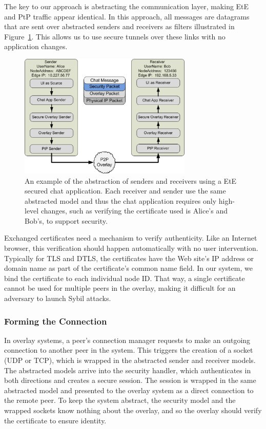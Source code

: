 \documentclass[conference]{IEEEtran}
\begin{document}
The key to our approach is abstracting the communication layer, making EtE and
PtP traffic appear identical. In this approach, all messages are datagrams that are sent
over abstracted senders and receivers as filters illustrated in
Figure~\ref{fig:senders_receivers}.  This allows us to use secure tunnels over
these links with no application changes.

\begin{figure}[h]
\centering
\includegraphics[width=3.25in]{secure_sender_stack_generic.png.eps}
\caption{An example of the abstraction of senders and receivers using a EtE 
secured chat application.  Each receiver and sender use the same abstracted
model and thus the chat application requires only high-level changes, such
as verifying the certificate used is Alice's and Bob's, to support security.}
\label{fig:senders_receivers}
\end{figure}

Exchanged certificates need a mechanism to verify authenticity.  Like an
Internet browser, this verification should happen automatically with no user
intervention.  Typically for TLS and DTLS, the certificates have the Web site's
IP address or domain name as part of the certificate's common name field.  In
our system, we bind the certificate to each individual node ID.  That way,
a single certificate cannot be used for multiple peers in the overlay, making
it difficult for an adversary to launch Sybil attacks.

\subsubsection{Forming the Connection}
In overlay systems, a peer's connection manager requests to make an outgoing
connection to another peer in the system.  This triggers the creation of a
socket (UDP or TCP), which is wrapped in the abstracted sender and receiver
models.  The abstracted models arrive into the security handler, which
authenticates in both directions and creates a secure session.  The session is
wrapped in the same abstracted model and presented to the overlay system as a
direct connection to the remote peer.  To keep the system abstract, the security
model and the wrapped sockets know nothing about the overlay, and so the overlay
should verify the certificate to ensure identity.
\end{document}
